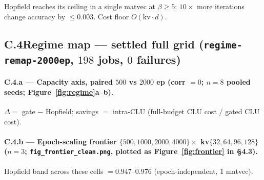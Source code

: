 \documentclass[11pt]{article}
\begin{document}
\noindent Hopfield reaches its ceiling in a single matvec at $\beta\ge5$; $10\times$ more iterations change accuracy by $\le0.003$. Cost floor $O(\text{kv}\cdot d)$.

\subsection*{C.4\quad Regime map --- settled full grid (\texttt{regime-remap-2000ep}, $198$ jobs, $0$ failures)}

\paragraph{C.4.a --- Capacity axis, paired $500$ vs $2000$ ep (corr $=0$; $n=8$ pooled seeds; Figure~\ref{fig:regime}a--b).} $\Delta=$ gate $-$ Hopfield; savings $=$ intra-CLU (full-budget CLU cost / gated CLU cost).


\paragraph{C.4.b --- Epoch-scaling frontier $\{500,1000,2000,4000\}\times$ kv$\{32,64,96,128\}$ ($n=3$; \texttt{fig\_frontier\_clean.png}, plotted as Figure~\ref{fig:frontier} in \S4.3).} Hopfield band across these cells $=0.947$--$0.976$ (epoch-independent, $1$ matvec).
\end{document}
